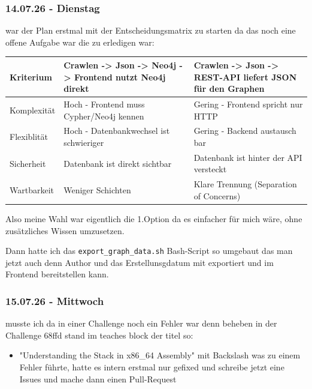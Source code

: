 \subsubsection{14.07.26 - Dienstag}

war der Plan erstmal mit der Entscheidungsmatrix zu starten da das noch eine offene Aufgabe war die zu erledigen war:

\begin{table}[h]
\centering
\begin{tabular}{|p{2cm}|p{6.5cm}|p{6.5cm}|}
\hline
\textbf{Kriterium} & \textbf{Crawlen -> Json -> Neo4j -> Frontend nutzt Neo4j direkt} & \textbf{Crawlen -> Json -> REST-API liefert JSON für den Graphen} \\
\hline
Komplexität & Hoch - Frontend muss Cypher/Neo4j kennen & Gering - Frontend spricht nur HTTP \\
\hline
Flexiblität & Hoch - Datenbankwechsel ist schwieriger & Gering - Backend austausch bar \\
\hline
Sicherheit & Datenbank ist direkt sichtbar & Datenbank ist hinter der API versteckt \\
\hline
Wartbarkeit & Weniger Schichten & Klare Trennung (Separation of Concerns) \\
\hline
\end{tabular}
\end{table}

Also meine Wahl war eigentlich die 1.Option da es einfacher für mich wäre, ohne zusätzliches Wissen umzusetzen.

Dann hatte ich das \texttt{export\_graph\_data.sh} Bash-Script so umgebaut das man jetzt auch denn Author und das Erstellunsgdatum mit exportiert und im Frontend bereitstellen kann.

\subsubsection{15.07.26 - Mittwoch}

musste ich da in einer Challenge noch ein Fehler war denn beheben in der Challenge 68ffd stand im teaches block der titel so:

\begin{itemize}
\item "Understanding the Stack in x86\_64 Assembly" mit Backslash was zu einem Fehler führte, hatte es intern erstmal nur gefixed und schreibe jetzt eine Issues und mache dann einen Pull-Request
\end{itemize}

